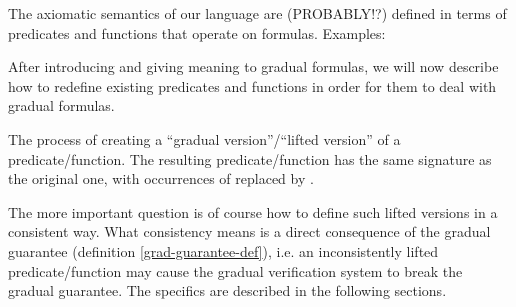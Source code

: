 
The axiomatic semantics of our language are (PROBABLY!?) defined in terms of predicates and functions that operate on formulas.
Examples:

After introducing and giving meaning to gradual formulas, we will now describe how to redefine existing predicates and functions in order for them to deal with gradual formulas.

\begin{definition}
    The process of creating a “gradual version”/“lifted version” of a predicate/function.
    The resulting predicate/function has the same signature as the original one, with occurrences of \setFormula replaced by \setGFormula.
\end{definition}

The more important question is of course how to define such lifted versions in a consistent way.
What consistency means is a direct consequence of the gradual guarantee (definition \ref{grad-guarantee-def}), i.e. an inconsistently lifted predicate/function may cause the gradual verification system to break the gradual guarantee.
The specifics are described in the following sections.




